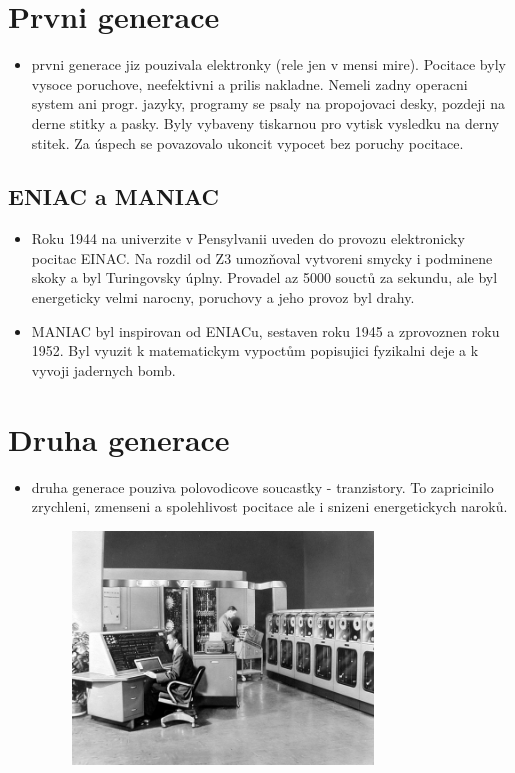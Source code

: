 \documentclass[a4paper,12pt]{article}
\begin{document}
\section{Prvni generace}
    \begin{itemize}
        \item{prvni generace jiz pouzivala elektronky (rele jen v mensi mire). Pocitace byly vysoce poruchove, neefektivni a prilis nakladne. Nemeli zadny operacni system ani progr. jazyky, programy se psaly na propojovaci desky, pozdeji na derne stitky a pasky. Byly vybaveny tiskarnou pro vytisk vysledku na derny stitek. Za úspech se povazovalo ukoncit vypocet bez poruchy pocitace.}
    \end{itemize}
    \subsection{ENIAC a MANIAC}
        \begin{itemize}
            \item{Roku 1944 na univerzite v Pensylvanii uveden do provozu elektronicky pocitac EINAC. Na rozdil od Z3 umozňoval vytvoreni smycky i podminene skoky a byl Turingovsky úplny. Provadel az 5000 souctů za sekundu, ale byl energeticky velmi narocny, poruchovy a jeho provoz byl drahy.}
            \item{MANIAC byl inspirovan od ENIACu, sestaven roku 1945 a zprovoznen roku 1952. Byl vyuzit k matematickym vypoctům popisujici fyzikalni deje a k vyvoji jadernych bomb.}
        \end{itemize}

\section{Druha generace}
    \begin{itemize}
        \item{druha generace pouziva polovodicove soucastky - tranzistory. To zapricinilo zrychleni, zmenseni a spolehlivost pocitace ale i snizeni energetickych naroků.}
        \begin{figure}[htp]
            \centering
            \includegraphics[width=8cm]{TVP_11_9_23@5.jpg}
        \end{figure}
    \end{itemize}
\end{document}
